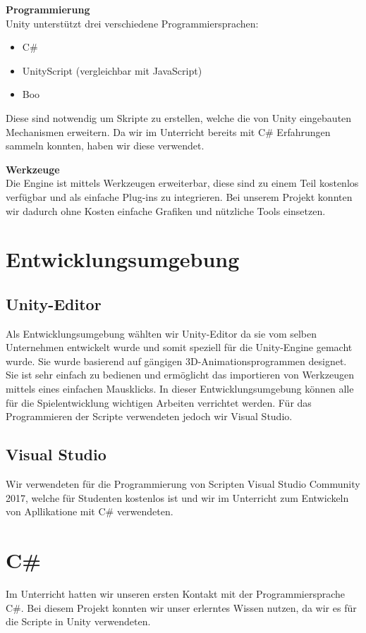 \textbf{Programmierung}\\
Unity unterstützt drei verschiedene Programmiersprachen:
\begin{itemize}
	\item C\#
	\item UnityScript (vergleichbar mit JavaScript)
	\item Boo
\end{itemize}
Diese sind notwendig um Skripte zu erstellen, welche die von Unity eingebauten Mechanismen erweitern. Da wir im Unterricht bereits mit C\# Erfahrungen sammeln konnten, haben wir diese verwendet.

\textbf{Werkzeuge}\\
Die Engine ist mittels Werkzeugen erweiterbar, diese sind zu einem Teil kostenlos verfügbar und als einfache Plug-ins zu integrieren. Bei unserem Projekt konnten wir dadurch ohne Kosten einfache Grafiken und nützliche Tools einsetzen.\\
\cite{Unity-Engine}

\section{Entwicklungsumgebung}
\subsection{Unity-Editor}
Als Entwicklungsumgebung wählten wir Unity-Editor da sie vom selben Unternehmen entwickelt wurde und somit speziell für die Unity-Engine gemacht wurde. Sie wurde basierend auf gängigen 3D-Animationsprogrammen designet. Sie ist sehr einfach zu bedienen und ermöglicht das importieren von Werkzeugen mittels eines einfachen Mausklicks. In dieser Entwicklungsumgebung können alle für die Spielentwicklung wichtigen Arbeiten verrichtet werden. Für das Programmieren der Scripte verwendeten jedoch wir Visual Studio.  \cite{Unity-Engine}

\subsection{Visual Studio}
Wir verwendeten für die Programmierung von Scripten Visual Studio Community 2017, welche für Studenten kostenlos ist und wir im Unterricht zum Entwickeln von Apllikatione mit C\# verwendeten. 

\section{C\#}
Im Unterricht hatten wir unseren ersten Kontakt mit der Programmiersprache C\#. Bei diesem Projekt konnten wir unser erlerntes Wissen nutzen, da wir es für die Scripte in Unity verwendeten.


